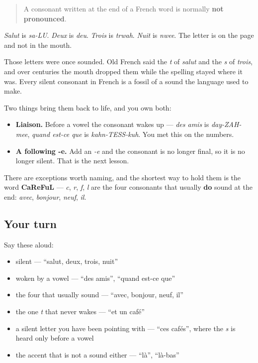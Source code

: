 \begin{cousinweb}
\begin{quote}
A consonant written at the end of a French word is normally \textbf{not pronounced}.
\end{quote}

\emph{Salut} is \emph{sa-LU}. \emph{Deux} is \emph{deu}. \emph{Trois} is \emph{trwah}. \emph{Nuit} is \emph{nwee}. The letter is on the page and not in the mouth.

Those letters were once sounded. Old French said the \emph{t} of \emph{salut} and the \emph{s} of \emph{trois}, and over centuries the mouth dropped them while the spelling stayed where it was. Every silent consonant in French is a fossil of a sound the language used to make.

Two things bring them back to life, and you own both:

\begin{itemize}
\raggedright
  \item \textbf{Liaison.} Before a vowel the consonant wakes up — \emph{des amis} is \emph{day-ZAH-mee}, \emph{quand est-ce que} is \emph{kahn-TESS-kuh}. You met this on the numbers.
  \item \textbf{A following -e.} Add an \emph{-e} and the consonant is no longer final, so it is no longer silent. That is the next lesson.
\end{itemize}

There are exceptions worth naming, and the shortest way to hold them is the word \textbf{CaReFuL} — \emph{c}, \emph{r}, \emph{f}, \emph{l} are the four consonants that usually \textbf{do} sound at the end: \emph{avec}, \emph{bonjour}, \emph{neuf}, \emph{il}.
\end{cousinweb}

\subsection*{Your turn}
Say these aloud:

\begin{itemize}
\raggedright
  \item silent — \textquotedblleft{}salut, deux, trois, nuit\textquotedblright{}
  \item woken by a vowel — \textquotedblleft{}des amis\textquotedblright{}, \textquotedblleft{}quand est-ce que\textquotedblright{}
  \item the four that usually sound — \textquotedblleft{}avec, bonjour, neuf, il\textquotedblright{}
  \item the one \emph{t} that never wakes — \textquotedblleft{}et un café\textquotedblright{}
  \item a silent letter you have been pointing with — \textquotedblleft{}ces cafés\textquotedblright{}, where the \emph{s} is heard only before a vowel
  \item the accent that is not a sound either — \textquotedblleft{}là\textquotedblright{}, \textquotedblleft{}là-bas\textquotedblright{}
\end{itemize}

